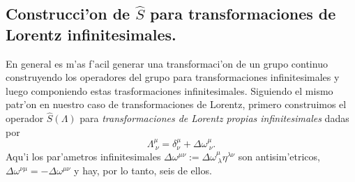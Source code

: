 \subsection{Construcci'on de $\hat{S}$ para transformaciones de Lorentz
infinitesimales.}

En general es m'as f'acil generar una
transformaci'on de un grupo continuo construyendo los operadores del
grupo para transformaciones infinitesimales y luego componiendo estas 
trasformaciones infinitesimales. Siguiendo el mismo patr'on en nuestro
caso de transformaciones de Lorentz, primero construimos el operador
$\hat{S}\left( 
\Lambda \right) $ para \emph{transformaciones de Lorentz propias
infinitesimales} dadas por 
\begin{equation}
\Lambda^\mu_{\ \nu }=\delta^\mu_\nu +\Delta \omega^\mu_{\ \nu }.
\label{LorInf}
\end{equation}
Aqu'i los par'ametros infinitesimales $\Delta \omega^{\mu\nu}:=\Delta
\omega^\mu_{\ \lambda}\eta^{\lambda\nu}$ son antisim'etricos, $\Delta
\omega^{\nu \mu }=-\Delta \omega^{\mu \nu }$ y hay, por lo tanto, seis de ellos.


